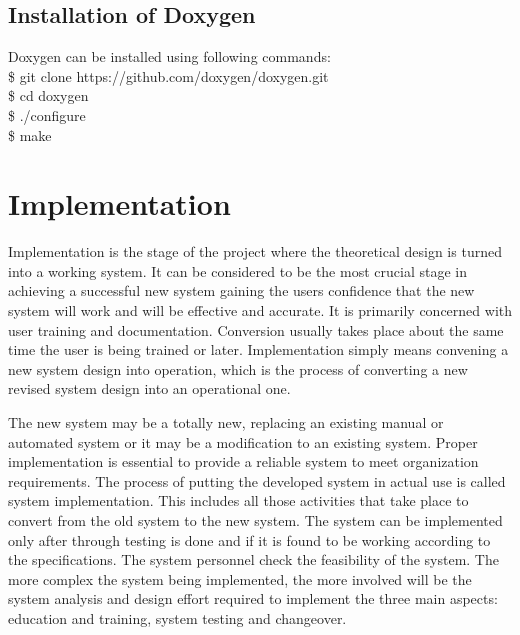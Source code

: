 \subsection{Installation of Doxygen}
Doxygen can be installed using following commands:\\

\hspace{4pt} \$ git clone https://github.com/doxygen/doxygen.git\\ 

\hspace{4pt} \$ cd doxygen\\

\hspace{4pt} \$ ./configure\\

\hspace{4pt} \$ make \\
\newpage


\section{Implementation}
Implementation is the stage of the project where the theoretical design is turned into a working system. It can be considered to be the most crucial stage in achieving a successful new system gaining the users confidence that the new system will work and will be effective and accurate. It is primarily concerned with user training and documentation. Conversion usually takes place about the same time the user is being trained or later. Implementation simply means convening a new system design into operation, which is the process of converting a new revised system design into an operational one.

The new system may be a totally new, replacing an existing manual or automated system or it may be a modification to an existing system. Proper implementation is essential to provide a reliable system to meet organization requirements. The process of putting the developed system in actual use is called system implementation. This includes all those activities that take place to convert from the old system to the new system. The system can be implemented only after through testing is done and if it is found to be working according to the specifications. The system personnel check the feasibility of the system. The more complex the system being implemented, the more involved will be the system analysis and design effort required to implement the three main aspects: education and training, system testing and changeover. 

